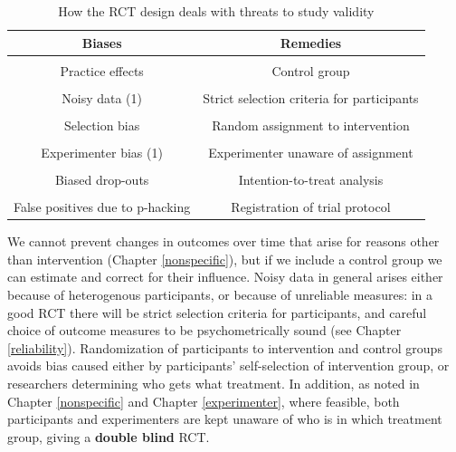\documentclass{krantz}
\begin{document}
\begin{table}

\caption{\label{tab:rctchart}How the RCT design deals with threats to study validity}
\centering
\begin{tabular}[t]{cc}
\toprule
Biases & Remedies\\
\midrule
\cellcolor{gray!6}{Spontaneous improvement} & \cellcolor{gray!6}{Control group}\\
Practice effects & Control group\\
\cellcolor{gray!6}{Regression to the mean} & \cellcolor{gray!6}{Control group}\\
Noisy data (1) & Strict selection criteria for participants\\
\cellcolor{gray!6}{Noisy data (2)} & \cellcolor{gray!6}{Outcomes with low measurement error}\\
\addlinespace
Selection bias & Random assignment to intervention\\
\cellcolor{gray!6}{Placebo effects} & \cellcolor{gray!6}{Participant unaware of assignment}\\
Experimenter bias (1) & Experimenter unaware of assignment\\
\cellcolor{gray!6}{Experimenter bias (2)} & \cellcolor{gray!6}{Strictly specified protocol}\\
Biased drop-outs & Intention-to-treat analysis\\
\addlinespace
\cellcolor{gray!6}{Low power} & \cellcolor{gray!6}{A priori power analysis}\\
False positives due to p-hacking & Registration of trial protocol\\
\bottomrule
\end{tabular}
\end{table}

We cannot prevent changes in outcomes over time that arise for reasons other than intervention (Chapter \ref{nonspecific}), but if we include a control group we can estimate and correct for their influence. Noisy data in general arises either because of heterogenous participants, or because of unreliable measures: in a good RCT there will be strict selection criteria for participants, and careful choice of outcome measures to be psychometrically sound (see Chapter \ref{reliability}). Randomization of participants to intervention and control groups avoids bias caused either by participants' self-selection of intervention group, or researchers determining who gets what treatment. In addition, as noted in Chapter \ref{nonspecific} and Chapter \ref{experimenter}, where feasible, both participants and experimenters are kept unaware of who is in which treatment group, giving a \textbf{double blind} RCT.
\end{document}
